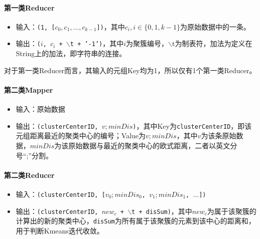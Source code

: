 \documentclass{ML}
\begin{document}
\paragraph{第一类Reducer}
\begin{itemize}
    \item 输入：\texttt{(1, [$c_0, c_1, \dots, c_{k-1}$])}，其中$c_i, i \in \{0, 1, k-1\}$为原始数据中的一条。
    \item 输出：\texttt{($i$, $c_i$ + \texttt{$\backslash$t} + '-1')}，其中$i$为聚簇编号，$\backslash$t为制表符，加法为定义在String上的加法，即字符串的连接。
\end{itemize}
对于第一类Reducer而言，其输入的元组Key均为1，所以仅有1个第一类Reducer。

\paragraph{第二类Mapper}
\begin{itemize}
    \item 输入：原始数据
    \item 输出：\texttt{(clusterCenterID, $v;minDis$)}，其中Key为\texttt{clusterCenterID}，即该元组距离最近的聚类中心的编号；Value为$v;minDis$，其中$v$为该条原始数据，$minDis$为该原始数据与最近的聚类中心的欧式距离，二者以英文分号“;”分割。
\end{itemize}

\paragraph{第二类Reducer}
\begin{itemize}
    \item 输入：\texttt{(clusterCenterID, [$v_0;minDis_0$, $v_1;minDis_1$, $\dots$])}
    \item 输出：\texttt{(clusterCenterID, $new_c$ + \texttt{$\backslash$t} + disSum)}，其中$new_c$为属于该聚簇的计算出的新的聚类中心，\texttt{disSum}为所有属于该聚簇的元素到该中心的距离和，用于判断Kmeans迭代收敛。
\end{itemize}
\end{document}
